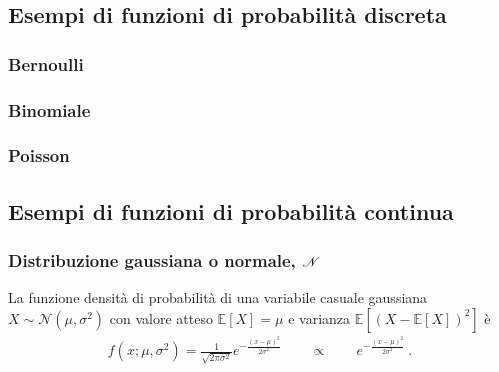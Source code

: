 \documentclass[letterpaper,10pt,italian]{jupyterBook}
\begin{document}
\subsection{Esempi di funzioni di probabilità discreta}
\label{\detokenize{ch/statistics/pfun_discrete_examples:esempi-di-funzioni-di-probabilita-discreta}}\label{\detokenize{ch/statistics/pfun_discrete_examples:statistics-hs-random-variables-discrete-examples}}\label{\detokenize{ch/statistics/pfun_discrete_examples::doc}}

\subsubsection{Bernoulli}
\label{\detokenize{ch/statistics/pfun_discrete_examples:bernoulli}}\label{\detokenize{ch/statistics/pfun_discrete_examples:statistics-hs-random-variables-discrete-examples-bernoulli}}

\subsubsection{Binomiale}
\label{\detokenize{ch/statistics/pfun_discrete_examples:binomiale}}\label{\detokenize{ch/statistics/pfun_discrete_examples:statistics-hs-random-variables-discrete-examples-binomial}}

\subsubsection{Poisson}
\label{\detokenize{ch/statistics/pfun_discrete_examples:poisson}}\label{\detokenize{ch/statistics/pfun_discrete_examples:statistics-hs-random-variables-discrete-examples-poisson}}
\sphinxstepscope


\subsection{Esempi di funzioni di probabilità continua}
\label{\detokenize{ch/statistics/pfun_continuous_examples:esempi-di-funzioni-di-probabilita-continua}}\label{\detokenize{ch/statistics/pfun_continuous_examples:statistics-hs-random-variables-continuous-examples}}\label{\detokenize{ch/statistics/pfun_continuous_examples::doc}}

\subsubsection{Distribuzione gaussiana o normale, \protect\(\mathscr{N}\protect\)}
\label{\detokenize{ch/statistics/pfun_continuous_examples:distribuzione-gaussiana-o-normale-mathscr-n}}\label{\detokenize{ch/statistics/pfun_continuous_examples:statistics-hs-random-variables-continuous-examples-norm}}
\sphinxAtStartPar
La funzione densità di probabilità di una variabile casuale gaussiana \(X \sim \mathscr{N}(\mu, \sigma^2)\)  con valore atteso \(\mathbb{E}[X] = \mu\) e varianza \(\mathbb{E}[(X-\mathbb{E}[X])^2]\) è
\begin{equation*}
\begin{split}f(x;\mu,\sigma^2) = \frac{1}{\sqrt{2\pi\sigma^2}} e^{-\frac{(x-\mu)^2}{2\sigma^2}} \qquad \propto \qquad e^{-\frac{(x-\mu)^2}{2\sigma^2}} \ .\end{split}
\end{equation*}
\end{document}
